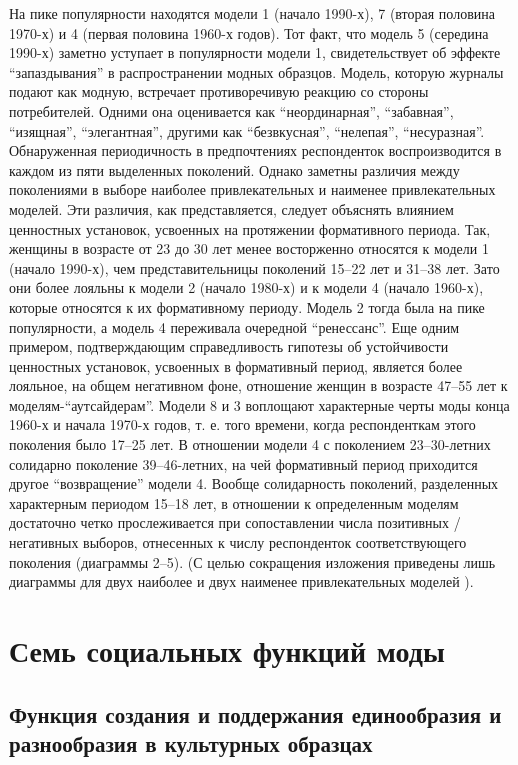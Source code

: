 На пике популярности находятся модели 1 (начало 1990-х), 7 (вторая половина 1970-х) и 4 (первая половина 1960-х годов). Тот факт, что модель 5 (середина 1990-х) заметно уступает в популярности модели 1, свидетельствует об эффекте “запаздывания” в распространении модных образцов. Модель, которую журналы подают как модную, встречает противоречивую реакцию со стороны потребителей. Одними она оценивается как “неординарная”, “забавная”, “изящная”, “элегантная”, другими как “безвкусная”, “нелепая”, “несуразная”.
Обнаруженная периодичность в предпочтениях респонденток воспроизводится в каждом из пяти выделенных поколений. Однако заметны различия между поколениями в выборе наиболее привлекательных и наименее привлекательных моделей. Эти различия, как представляется, следует объяснять влиянием ценностных установок, усвоенных на протяжении формативного периода. Так, женщины в возрасте от 23 до 30 лет менее восторженно относятся к модели 1 (начало 1990-х), чем представительницы поколений 15–22 лет и 31–38 лет. Зато они более лояльны к модели 2 (начало 1980-х) и к модели 4 (начало 1960-х), которые относятся к их формативному периоду. Модель 2 тогда была на пике популярности, а модель 4 переживала очередной “ренессанс”. Еще одним примером, подтверждающим справедливость гипотезы об устойчивости ценностных установок, усвоенных в формативный период, является более лояльное, на общем негативном фоне, отношение женщин в возрасте 47–55 лет к моделям-“аутсайдерам”. Модели 8 и 3 воплощают характерные черты моды конца 1960-х и начала 1970-х годов, т. е. того времени, когда респонденткам этого поколения было 17–25 лет. В отношении модели 4 с поколением 23–30-летних солидарно поколение 39–46-летних, на чей формативный период приходится другое “возвращение” модели 4. Вообще солидарность поколений, разделенных характерным периодом 15–18 лет, в отношении к определенным моделям достаточно четко прослеживается при сопоставлении числа позитивных / негативных выборов, отнесенных к числу респонденток соответствующего поколения (диаграммы 2–5). (С целью сокращения изложения приведены лишь диаграммы для двух наиболее и двух наименее привлекательных моделей ).~\cite{bib:2}

  \section{Семь социальных функций моды}
  \subsection{Функция создания и поддержания единообразия и разнообразия в
    культурных образцах}
    
